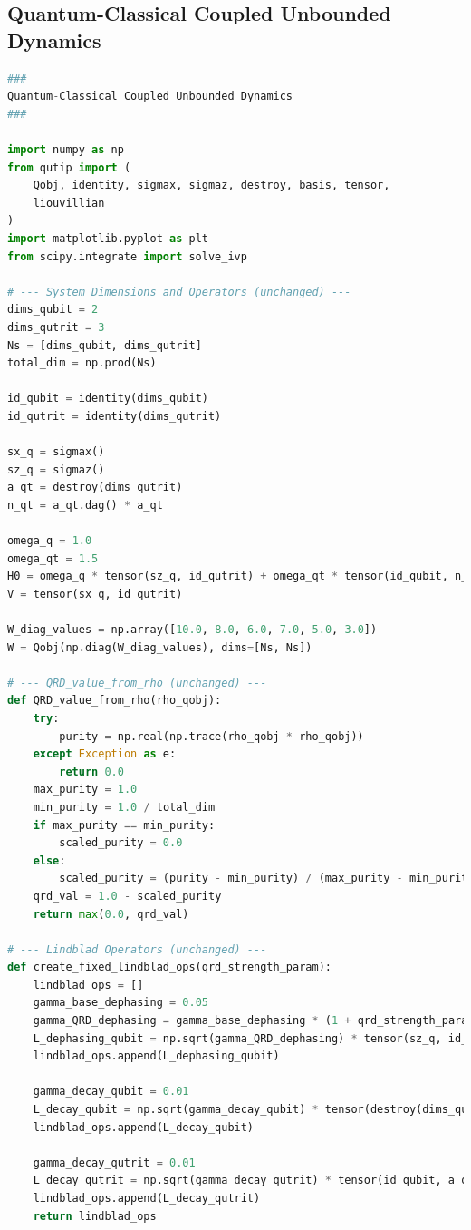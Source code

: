 \documentclass[9pt]{article}
\begin{document}
\subsection{Quantum-Classical Coupled Unbounded Dynamics}
\begin{lstlisting}[language=Python, basicstyle=\ttfamily\footnotesize, breaklines=true, frame=single, caption={Python Code for Quantum-Classical Coupled Unbounded Dynamics}, label={lst:qrd_code}]
###
Quantum-Classical Coupled Unbounded Dynamics
###

import numpy as np
from qutip import (
    Qobj, identity, sigmax, sigmaz, destroy, basis, tensor,
    liouvillian
)
import matplotlib.pyplot as plt
from scipy.integrate import solve_ivp

# --- System Dimensions and Operators (unchanged) ---
dims_qubit = 2
dims_qutrit = 3
Ns = [dims_qubit, dims_qutrit]
total_dim = np.prod(Ns)

id_qubit = identity(dims_qubit)
id_qutrit = identity(dims_qutrit)

sx_q = sigmax()
sz_q = sigmaz()
a_qt = destroy(dims_qutrit)
n_qt = a_qt.dag() * a_qt

omega_q = 1.0
omega_qt = 1.5
H0 = omega_q * tensor(sz_q, id_qutrit) + omega_qt * tensor(id_qubit, n_qt)
V = tensor(sx_q, id_qutrit)

W_diag_values = np.array([10.0, 8.0, 6.0, 7.0, 5.0, 3.0])
W = Qobj(np.diag(W_diag_values), dims=[Ns, Ns])

# --- QRD_value_from_rho (unchanged) ---
def QRD_value_from_rho(rho_qobj):
    try:
        purity = np.real(np.trace(rho_qobj * rho_qobj))
    except Exception as e:
        return 0.0
    max_purity = 1.0
    min_purity = 1.0 / total_dim
    if max_purity == min_purity:
        scaled_purity = 0.0
    else:
        scaled_purity = (purity - min_purity) / (max_purity - min_purity)
    qrd_val = 1.0 - scaled_purity
    return max(0.0, qrd_val)

# --- Lindblad Operators (unchanged) ---
def create_fixed_lindblad_ops(qrd_strength_param):
    lindblad_ops = []
    gamma_base_dephasing = 0.05
    gamma_QRD_dephasing = gamma_base_dephasing * (1 + qrd_strength_param * 2.0)
    L_dephasing_qubit = np.sqrt(gamma_QRD_dephasing) * tensor(sz_q, id_qutrit)
    lindblad_ops.append(L_dephasing_qubit)

    gamma_decay_qubit = 0.01
    L_decay_qubit = np.sqrt(gamma_decay_qubit) * tensor(destroy(dims_qubit), id_qutrit)
    lindblad_ops.append(L_decay_qubit)

    gamma_decay_qutrit = 0.01
    L_decay_qutrit = np.sqrt(gamma_decay_qutrit) * tensor(id_qubit, a_qt)
    lindblad_ops.append(L_decay_qutrit)
    return lindblad_ops


\end{lstlisting}
\end{document}
